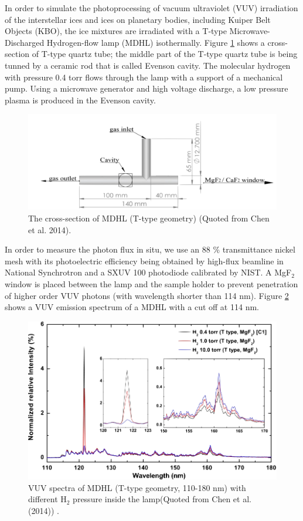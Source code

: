 In order to simulate the photoprocessing of vacuum ultraviolet (VUV) irradiation of the interstellar ices and ices on planetary bodies, including Kuiper Belt Objects (KBO), the ice mixtures are irradiated with a T-type Microwave-Discharged Hydrogen-flow lamp (MDHL) isothermally. Figure \ref{fig:T_type} shows a cross-section of T-type quartz tube; the middle part of the T-type quartz tube is being tunned by a ceramic rod that is called Evenson cavity. The molecular hydrogen with pressure 0.4 torr flows through the lamp with a support of a mechanical pump. Using a  microwave generator and high voltage discharge, a low pressure plasma is produced in the Evenson cavity.
\begin{figure}
\centering
\includegraphics[width=\textwidth]{figures/chapter2/T_type.png}
\caption{The cross-section of MDHL (T-type geometry) (Quoted from Chen et al. 2014).}
\label{fig:T_type}
\end{figure}
In order to measure the photon flux in situ, we use an 88 \% transmittance nickel mesh with its photoelectric efficiency being obtained by high-flux beamline in National Synchrotron and a SXUV 100 photodiode calibrated by NIST. A MgF$_2$ window is placed between the lamp and the sample holder to prevent penetration of higher order VUV photons (with wavelength shorter than 114 nm). Figure \ref{fig:MDHL} shows a VUV emission spectrum of a MDHL with a cut off at 114 nm.
\begin{figure}
\centering
\includegraphics[width=\textwidth]{figures/chapter2/MDHL.png}
\caption{VUV spectra of MDHL (T-type geometry, 110-180 nm) with different H$_2$ pressure inside the lamp(Quoted from Chen et al. (2014)\cite{chen2013vacuum}) .}
\label{fig:MDHL}
\end{figure}
